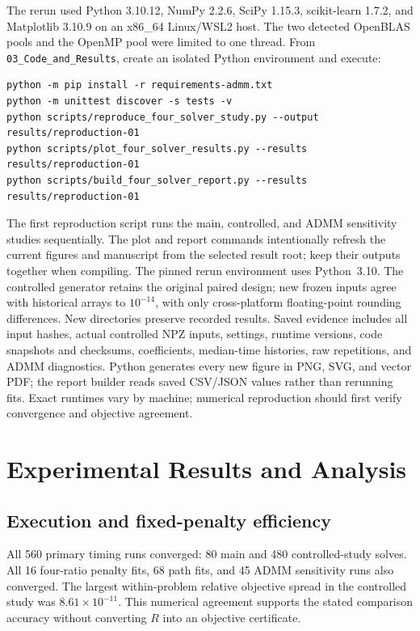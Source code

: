 \documentclass[10pt,letterpaper]{article}
\begin{document}
The rerun used Python 3.10.12, NumPy 2.2.6, SciPy 1.15.3, scikit-learn 1.7.2, and Matplotlib 3.10.9 on an x86\_64 Linux/WSL2 host. The two detected OpenBLAS pools and the OpenMP pool were limited to one thread. From \texttt{03\_Code\_and\_Results}, create an isolated Python environment and execute:
{\small
\begin{verbatim}
python -m pip install -r requirements-admm.txt
python -m unittest discover -s tests -v
python scripts/reproduce_four_solver_study.py --output results/reproduction-01
python scripts/plot_four_solver_results.py --results results/reproduction-01
python scripts/build_four_solver_report.py --results results/reproduction-01
\end{verbatim}
}
The first reproduction script runs the main, controlled, and ADMM sensitivity studies sequentially. The plot and report commands intentionally refresh the current figures and manuscript from the selected result root; keep their outputs together when compiling. The pinned rerun environment uses Python~3.10. The controlled generator retains the original paired design; new frozen inputs agree with historical arrays to $10^{-14}$, with only cross-platform floating-point rounding differences.
New directories preserve recorded results. Saved evidence includes all input hashes, actual controlled NPZ inputs, settings, runtime versions, code snapshots and checksums, coefficients, median-time histories, raw repetitions, and ADMM diagnostics. Python generates every new figure in PNG, SVG, and vector PDF; the report builder reads saved CSV/JSON values rather than rerunning fits. Exact runtimes vary by machine; numerical reproduction should first verify convergence and objective agreement.

\FloatBarrier
\section{Experimental Results and Analysis}
\subsection{Execution and fixed-penalty efficiency}
All 560 primary timing runs converged: 80 main and 480 controlled-study solves. All 16 four-ratio penalty fits, 68 path fits, and 45 ADMM sensitivity runs also converged. The largest within-problem relative objective spread in the controlled study was $8.61\times10^{-11}$. This numerical agreement supports the stated comparison accuracy without converting $R$ into an objective certificate.
\end{document}
